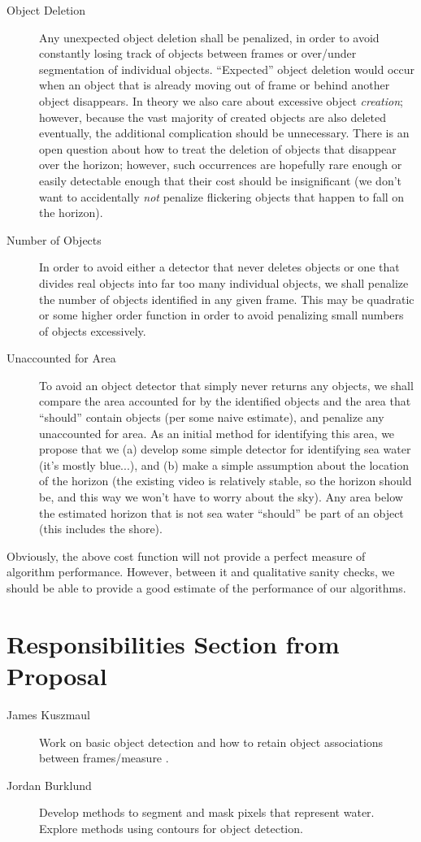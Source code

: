 \documentclass{article}
\begin{document}
\begin{description}
\item[Object Deletion] Any unexpected object deletion shall
   be penalized, in order to avoid constantly losing track
   of objects between frames or over/under segmentation of
   individual objects. ``Expected'' object deletion would
   occur when an object that is already moving out of frame
   or behind another object disappears. In theory we also
   care about excessive object \emph{creation}; however,
   because the vast majority of created objects are also
   deleted eventually, the additional complication should
   be unnecessary. There is an open question about how
   to treat the deletion of objects that disappear over
   the horizon; however, such occurrences are hopefully
   rare enough or easily detectable enough that their
   cost should be insignificant (we don't want to
   accidentally \emph{not} penalize flickering objects
   that happen to fall on the horizon).
\item[Number of Objects] In order to avoid either a
   detector that never deletes objects or one that
   divides real objects into far too many individual
   objects, we shall penalize the number of objects
   identified in any given frame. This may be quadratic
   or some higher order function in order to avoid
   penalizing small numbers of objects excessively.
\item[Unaccounted for Area] To avoid an object
   detector that simply never returns any objects,
   we shall compare the area accounted for by the
   identified objects and the area that ``should''
   contain objects (per some naive estimate), and
   penalize any unaccounted for area.
   As an initial method for identifying this area,
   we propose that we (a) develop some simple detector
   for identifying sea water (it's mostly blue...),
   and (b) make a simple assumption about the location
   of the horizon (the existing video is relatively stable,
   so the horizon should be, and this way we won't have
   to worry about the sky). Any area below the estimated
   horizon that is not sea water ``should'' be part of
   an object (this includes the shore).
\end{description}

Obviously, the above cost function will not provide a perfect
measure of algorithm performance. However, between it and
qualitative sanity checks, we should be able to provide
a good estimate of the performance of our algorithms.

\section{Responsibilities Section from Proposal}
\begin{description}
\item[James Kuszmaul] Work on basic object detection and how
  to retain object associations between frames/measure .

\item[Jordan Burklund] Develop methods to segment and mask pixels that represent water. Explore methods using contours for object detection.
\end{description}



\end{document}
